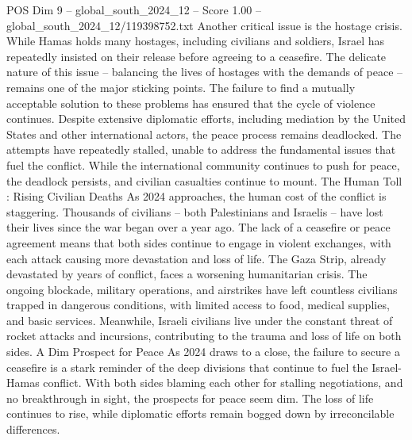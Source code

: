 \begin{textsample}{POS Dim 9 – global\_south\_2024\_12 – Score 1.00 – global\_south\_2024\_12/119398752.txt}
Another critical issue is the hostage crisis.
While Hamas holds many hostages, including civilians and soldiers, Israel has repeatedly insisted on their release before agreeing to a ceasefire.
The delicate nature of this issue -- balancing the lives of hostages with the demands of peace -- remains one of the major sticking points.
The failure to find a mutually acceptable solution to these problems has ensured that the cycle of violence continues.
Despite extensive diplomatic efforts, including mediation by the United States and other international actors, the peace process remains deadlocked.
The attempts have repeatedly stalled, unable to address the fundamental issues that fuel the conflict.
While the international community continues to push for peace, the deadlock persists, and civilian casualties continue to mount.
The Human Toll : Rising Civilian Deaths As 2024 approaches, the human cost of the conflict is staggering.
Thousands of civilians -- both Palestinians and Israelis -- have lost their lives since the war began over a year ago.
The lack of a ceasefire or peace agreement means that both sides continue to engage in violent exchanges, with each attack causing more devastation and loss of life.
The Gaza Strip, already devastated by years of conflict, faces a worsening humanitarian crisis.
The ongoing blockade, military operations, and airstrikes have left countless civilians trapped in dangerous conditions, with limited access to food, medical supplies, and basic services.
Meanwhile, Israeli civilians live under the constant threat of rocket attacks and incursions, contributing to the trauma and loss of life on both sides.
A Dim Prospect for Peace As 2024 draws to a close, the failure to secure a ceasefire is a stark reminder of the deep divisions that continue to fuel the Israel-Hamas conflict.
With both sides blaming each other for stalling negotiations, and no breakthrough in sight, the prospects for peace seem dim.
The loss of life continues to rise, while diplomatic efforts remain bogged down by irreconcilable differences.

\end{textsample}
